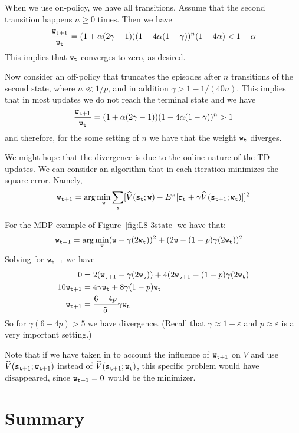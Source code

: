 When we use on-policy, we have all transitions. Assume that the
second transition happens $n\geq 0$ times. Then we have
\[
\frac{{\tt w}_{{\tt t}+1}}{{\tt w}_{\tt t}}=(1+\alpha(2\gamma-1))(1-4\alpha(1-\gamma))^n(1-4\alpha)<
1-\alpha
\]
This implies that ${\tt w}_{\tt t}$ converges to zero, as desired.

Now consider an off-policy that truncates the episodes after $n$
transitions of the second state, where $n\ll 1/p$, and in addition
$\gamma> 1-1/(40n)$. This implies that in most updates we do not
reach the terminal state and we have
\[
\frac{{\tt w}_{{\tt t}+1}}{{\tt w}_{\tt t}}=(1+\alpha(2\gamma-1))(1-4\alpha(1-\gamma))^n>1
\]
and therefore, for the some setting of $n$ we have that the weight
${\tt w}_{\tt t}$ diverges.

We might hope that the divergence is due to the online nature of the
TD updates. We can consider an algorithm that in each iteration
minimizes the square error. Namely,
\[
{\tt w}_{{\tt t}+1}=\arg\min_{\tt w}\sum_s
[\widehat{V}({\tt s}_{\tt t};{\tt w})-E^\pi[{\tt r}_{\tt t}+\gamma\widehat{V}({\tt s}_{{\tt t}+1};{\tt w}_{\tt t})]]^2
\]

For the MDP example of Figure~\ref{fig:L8-3state} we have that:
\begin{align*}
 {\tt w}_{{\tt t}+1} &= \arg\min_{\tt w} ({\tt w}-\gamma(2{\tt w}_{\tt t}))^2+(2{\tt w}-(1-p)\gamma(2{\tt w}_{\tt t}))^2
\end{align*}
Solving for ${\tt w}_{{\tt t}+1}$ we have
\begin{align*}
0&=  2({\tt w}_{{\tt t}+1}-\gamma(2{\tt w}_{\tt t}))+4(2{\tt w}_{{\tt t}+1}-(1-p)\gamma(2{\tt w}_{\tt t})\\
  10 {\tt w}_{{\tt t}+1}&=4\gamma {\tt w}_{\tt t} + 8\gamma(1-p){\tt w}_{\tt t}\\
  {\tt w}_{{\tt t}+1}&=\frac{6-4p}{5}\gamma {\tt w}_{\tt t}
\end{align*}
So for $\gamma(6-4p)>5$ we have divergence. (Recall that
$\gamma\approx 1-\varepsilon$ and $p\approx \varepsilon$ is a very
important setting.)

Note that if we have taken in to account the influence of
${\tt w}_{{\tt t}+1}$ on $V$ and use
$\widehat{V}({\tt s}_{{\tt t}+1};{\tt w}_{{\tt t}+1})$ instead of
$\widehat{V}({\tt s}_{{\tt t}+1};{\tt w}_{\tt t})$, this specific
problem would have disappeared, since ${\tt w}_{{\tt t}+1}=0$ would
be the minimizer.

\section{Summary}

